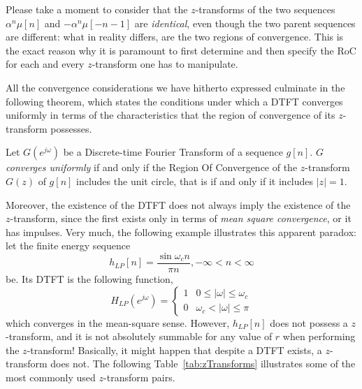 \documentclass[\documentfontsize, twocolumn]{\classname}
\begin{document}
Please take a moment to consider that the $z$-transforms of the two sequences $\alpha^n \mu[n]$ and $-\alpha^n\mu[-n-1]$ are \emph{identical}, even though the two parent sequences are different: what in reality differs, are the two regions of convergence. This is the exact reason why it is paramount to first determine and then specify the RoC for each and every $z$-transform one has to manipulate.

All the convergence considerations we have hitherto ex\-pres\-sed culminate in the following theorem, which states the conditions under which a DTFT converges uniformly in terms of the characteristics that the region of convergence of its $z$-transform possesses.

\begin{thm}\label{thm:convergenceDTFTz}
    Let $G(e^{j\omega})$ be a Discrete-time Fourier Transform of a sequence $g[n]$. $G$ \emph{converges uniformly} if and only if the Region Of Convergence of the $z$-transform $G(z)$ of $g[n]$ includes the unit circle, that is if and only if it includes $|z| = 1$.
\end{thm}

Moreover, the existence of the DTFT does not always imply the existence of the $z$-transform, since the first exists only in terms of \emph{mean square convergence}, or it has impulses. Very much, the following example illustrates this apparent paradox: let the finite energy sequence
\[
    h_{LP}[n] = \frac{\sin{\omega_c n}}{\pi n}, -\infty < n < \infty
\]
be. Its DTFT is the following function,
\[
    H_{LP}(e^{j\omega}) = 
    \left\{
        \begin{array}{ll}
            1 & 0 \leq |\omega| \leq \omega_c\\
            0 & \omega_c < |\omega| \leq \pi
        \end{array}
    \right.
\]
which converges in the mean-square sense. However, $h_{LP}[n]$ does not possess a $z$-transform, and it is not absolutely sum\-ma\-ble for any value of $r$ when performing the $z$-transform! Basically, it might happen that despite a DTFT exists, a $z$-transform does not. The following Table~\ref{tab:zTransforms} illustrates some of the most commonly used $z$-transform pairs.
\end{document}
